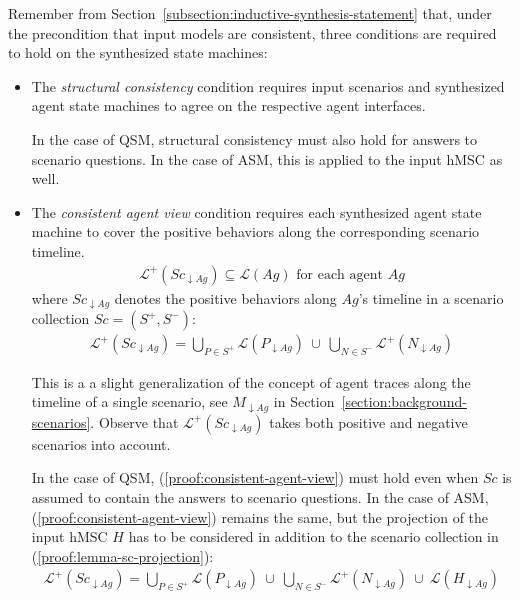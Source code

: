Remember from Section~\ref{subsection:inductive-synthesis-statement} that, under the precondition that input models are consistent, three conditions are required to hold on the synthesized state machines:
\begin{itemize}
\item The \emph{structural consistency} condition requires input scenarios and synthesized agent state machines to agree on the respective agent interfaces. 

In the case of QSM, structural consistency must also hold for answers to scenario questions. In the case of ASM, this is applied to the input hMSC as well.

\item The \emph{consistent agent view} condition requires each synthesized agent state machine to cover the positive behaviors along the corresponding scenario timeline.
\begin{align}
\mathcal{L}^+(Sc_{\downarrow Ag}) \subseteq \mathcal{L}(Ag)\mbox{~for each agent $Ag$}\label{proof:consistent-agent-view}
\end{align}
where $Sc_{\downarrow Ag}$ denotes the positive behaviors along $Ag$'s timeline in a scenario collection $Sc = (S^+, S^-)$:
\begin{align}
\mathcal{L}^+(Sc_{\downarrow Ag}) = \bigcup_{P \in S^+} \mathcal{L}(P_{\downarrow Ag})~\cup~\bigcup_{N \in S^{-}} \mathcal{L}^{+}(N_{\downarrow Ag})\label{proof:lemma-sc-projection}
\end{align}

This is a a slight generalization of the concept of agent traces along the timeline of a single scenario, see $M_{\downarrow Ag}$ in Section~\ref{section:background-scenarios}. Observe that $\mathcal{L}^+(Sc_{\downarrow Ag})$ takes both positive and negative scenarios into account.

In the case of QSM, (\ref{proof:consistent-agent-view}) must hold even when $Sc$ is assumed to contain the answers to scenario questions. In the case of ASM, (\ref{proof:consistent-agent-view}) remains the same, but the projection of the input hMSC $H$ has to be considered in addition to the scenario collection in (\ref{proof:lemma-sc-projection}):
\begin{align}
\mathcal{L}^+(Sc_{\downarrow Ag}) = \bigcup_{P \in S^+} \mathcal{L}(P_{\downarrow Ag})~\cup~\bigcup_{N \in S^{-}} \mathcal{L}^{+}(N_{\downarrow Ag})~\cup~\mathcal{L}(H_{\downarrow Ag})\label{proof:lemma-sc-projection-asm}
\end{align}


\end{itemize}
